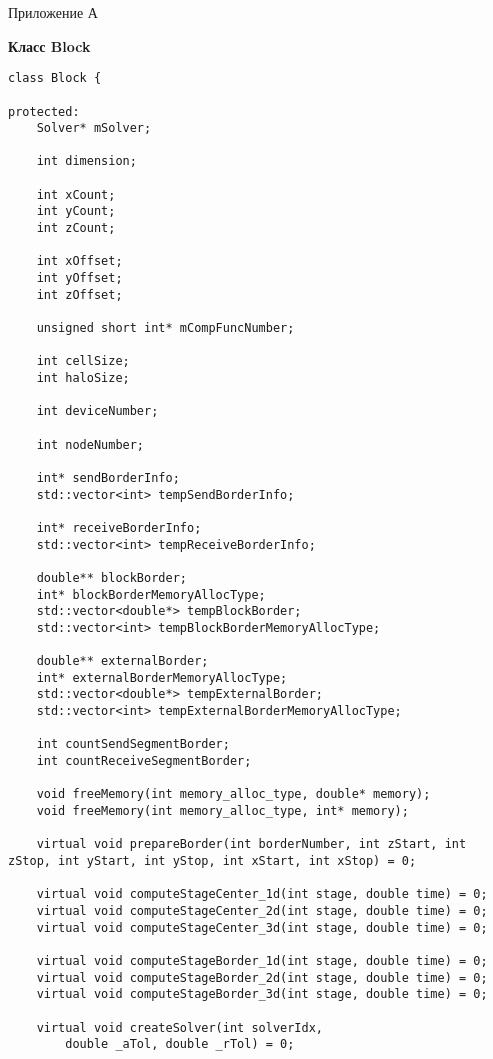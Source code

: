 \documentclass[a4paper, 14pt]{extarticle}
\theoremstyle{definition}
\begin{document}
\newpage

\begin{flushright}
Приложение А
\end{flushright}

\begin{center}
\textbf{Класс Block}
\end{center}

\begin{lstlisting}
class Block {

protected:
	Solver* mSolver;

	int dimension;

	int xCount;
	int yCount;
	int zCount;

	int xOffset;
	int yOffset;
	int zOffset;

	unsigned short int* mCompFuncNumber;

	int cellSize;
	int haloSize;

	int deviceNumber;

	int nodeNumber;

	int* sendBorderInfo;
	std::vector<int> tempSendBorderInfo;

	int* receiveBorderInfo;
	std::vector<int> tempReceiveBorderInfo;

	double** blockBorder;
	int* blockBorderMemoryAllocType;
	std::vector<double*> tempBlockBorder;
	std::vector<int> tempBlockBorderMemoryAllocType;

	double** externalBorder;
	int* externalBorderMemoryAllocType;
	std::vector<double*> tempExternalBorder;
	std::vector<int> tempExternalBorderMemoryAllocType;

	int countSendSegmentBorder;
	int countReceiveSegmentBorder;

	void freeMemory(int memory_alloc_type, double* memory);
	void freeMemory(int memory_alloc_type, int* memory);

	virtual void prepareBorder(int borderNumber, int zStart, int zStop, int yStart, int yStop, int xStart, int xStop) = 0;

	virtual void computeStageCenter_1d(int stage, double time) = 0;
	virtual void computeStageCenter_2d(int stage, double time) = 0;
	virtual void computeStageCenter_3d(int stage, double time) = 0;

	virtual void computeStageBorder_1d(int stage, double time) = 0;
	virtual void computeStageBorder_2d(int stage, double time) = 0;
	virtual void computeStageBorder_3d(int stage, double time) = 0;

	virtual void createSolver(int solverIdx,
		double _aTol, double _rTol) = 0;


\end{lstlisting}
\end{document}
